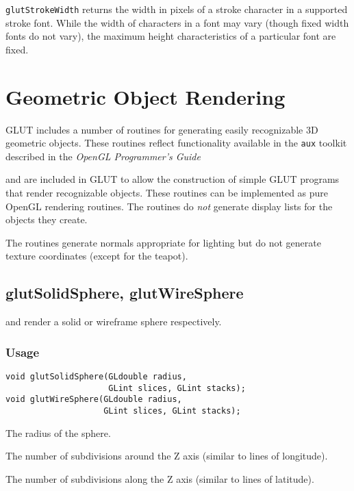 {\tt glutStrokeWidth} returns the width in pixels of a stroke character
in a supported stroke font.  While the width of characters in a font
may vary (though fixed width fonts do not vary), the maximum height
characteristics of a particular font are fixed.

\section{Geometric Object Rendering}

GLUT includes a number of routines for generating easily recognizable 3D geometric
objects.  These routines reflect functionality available in the {\tt aux} toolkit described in the {\em OpenGL Programmer's Guide}

and are included in GLUT to allow the construction of simple GLUT programs that
render recognizable objects.  These routines can be implemented as pure OpenGL
rendering routines.
The routines do {\em not} generate display lists for the objects they create.

The routines generate normals appropriate for lighting but do not generate
texture coordinates (except for the teapot).

\subsection{glutSolidSphere, glutWireSphere}

 and  render a solid or wireframe
sphere respectively.

\subsubsection*{Usage}
\begin{verbatim}
void glutSolidSphere(GLdouble radius,
                     GLint slices, GLint stacks);
void glutWireSphere(GLdouble radius,
                    GLint slices, GLint stacks);
\end{verbatim}
\begin{description}
\itemsep 0in
\item[{\tt radius}]
The radius of the sphere.
\item[{\tt slices}]
The number of subdivisions around the Z axis (similar to lines of longitude).
\item[{\tt stacks}]
The number of subdivisions along the Z axis (similar to lines of latitude).
\end{description}

